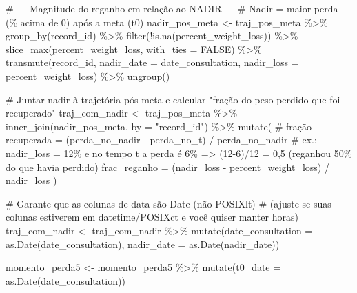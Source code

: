 \documentclass[
]{article}
\newenvironment{Shaded}{\begin{snugshade}}{\end{snugshade}}
\newcommand{\AttributeTok}[1]{\textcolor[rgb]{0.40,0.45,0.13}{#1}}
\newcommand{\CommentTok}[1]{\textcolor[rgb]{0.37,0.37,0.37}{#1}}
\newcommand{\ConstantTok}[1]{\textcolor[rgb]{0.56,0.35,0.01}{#1}}
\newcommand{\FunctionTok}[1]{\textcolor[rgb]{0.28,0.35,0.67}{#1}}
\newcommand{\NormalTok}[1]{\textcolor[rgb]{0.00,0.23,0.31}{#1}}
\newcommand{\OtherTok}[1]{\textcolor[rgb]{0.00,0.23,0.31}{#1}}
\newcommand{\SpecialCharTok}[1]{\textcolor[rgb]{0.37,0.37,0.37}{#1}}
\newcommand{\StringTok}[1]{\textcolor[rgb]{0.13,0.47,0.30}{#1}}
\begin{document}
\begin{Shaded}
\begin{Highlighting}[]
\CommentTok{\# {-}{-}{-} Magnitude do reganho em relação ao NADIR {-}{-}{-}}
\CommentTok{\# Nadir = maior perda (\% acima de 0) após a meta (t0)}
\NormalTok{nadir\_pos\_meta }\OtherTok{\textless{}{-}}\NormalTok{ traj\_pos\_meta }\SpecialCharTok{\%\textgreater{}\%}
  \FunctionTok{group\_by}\NormalTok{(record\_id) }\SpecialCharTok{\%\textgreater{}\%}
  \FunctionTok{filter}\NormalTok{(}\SpecialCharTok{!}\FunctionTok{is.na}\NormalTok{(percent\_weight\_loss)) }\SpecialCharTok{\%\textgreater{}\%}
  \FunctionTok{slice\_max}\NormalTok{(percent\_weight\_loss, }\AttributeTok{with\_ties =} \ConstantTok{FALSE}\NormalTok{) }\SpecialCharTok{\%\textgreater{}\%}
  \FunctionTok{transmute}\NormalTok{(record\_id,}
            \AttributeTok{nadir\_date  =}\NormalTok{ date\_consultation,}
            \AttributeTok{nadir\_loss  =}\NormalTok{ percent\_weight\_loss) }\SpecialCharTok{\%\textgreater{}\%}
  \FunctionTok{ungroup}\NormalTok{()}

\CommentTok{\# Juntar nadir à trajetória pós{-}meta e calcular "fração do peso perdido que foi recuperado"}
\NormalTok{traj\_com\_nadir }\OtherTok{\textless{}{-}}\NormalTok{ traj\_pos\_meta }\SpecialCharTok{\%\textgreater{}\%}
  \FunctionTok{inner\_join}\NormalTok{(nadir\_pos\_meta, }\AttributeTok{by =} \StringTok{"record\_id"}\NormalTok{) }\SpecialCharTok{\%\textgreater{}\%}
  \FunctionTok{mutate}\NormalTok{(}
    \CommentTok{\# fração recuperada = (perda\_no\_nadir {-} perda\_no\_t) / perda\_no\_nadir}
    \CommentTok{\# ex.: nadir\_loss = 12\% e no tempo t a perda é 6\% =\textgreater{} (12{-}6)/12 = 0,5 (reganhou 50\% do que havia perdido)}
    \AttributeTok{frac\_reganho =}\NormalTok{ (nadir\_loss }\SpecialCharTok{{-}}\NormalTok{ percent\_weight\_loss) }\SpecialCharTok{/}\NormalTok{ nadir\_loss}
\NormalTok{  )}

\CommentTok{\# Garante que as colunas de data são Date (não POSIXlt)}
\CommentTok{\# (ajuste se suas colunas estiverem em datetime/POSIXct e você quiser manter horas)}
\NormalTok{traj\_com\_nadir }\OtherTok{\textless{}{-}}\NormalTok{ traj\_com\_nadir }\SpecialCharTok{\%\textgreater{}\%}
  \FunctionTok{mutate}\NormalTok{(}\AttributeTok{date\_consultation =} \FunctionTok{as.Date}\NormalTok{(date\_consultation),}
         \AttributeTok{nadir\_date        =} \FunctionTok{as.Date}\NormalTok{(nadir\_date))}

\NormalTok{momento\_perda5 }\OtherTok{\textless{}{-}}\NormalTok{ momento\_perda5 }\SpecialCharTok{\%\textgreater{}\%}
  \FunctionTok{mutate}\NormalTok{(}\AttributeTok{t0\_date =} \FunctionTok{as.Date}\NormalTok{(date\_consultation))}


\end{Highlighting}
\end{Shaded}
\end{document}
